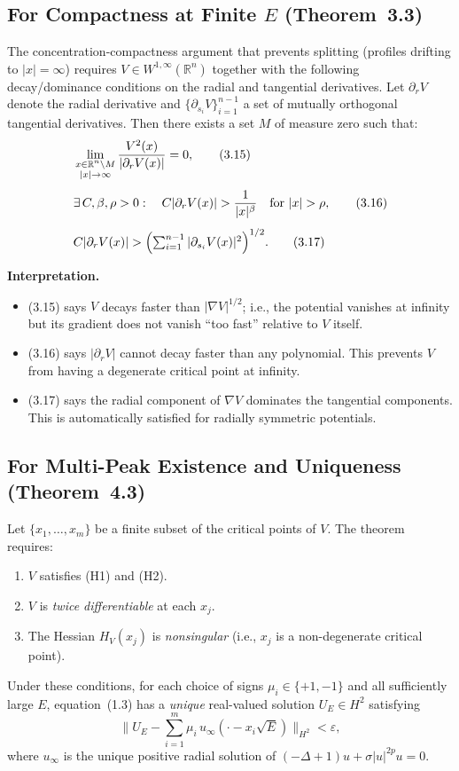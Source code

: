 \documentclass[11pt]{article}
\begin{document}
\subsection{For Compactness at Finite $E$ (Theorem~3.3)}

The concentration-compactness argument that prevents splitting (profiles drifting to $|x|=\infty$) requires $V\in W^{1,\infty}(\mathbb{R}^n)$ together with the following decay/dominance conditions on the radial and tangential derivatives. Let $\partial_r V$ denote the radial derivative and $\{\partial_{s_i}V\}_{i=1}^{n-1}$ a set of mutually orthogonal tangential derivatives. Then there exists a set $M$ of measure zero such that:
\begin{align}
  &\lim_{\substack{x\in\mathbb{R}^n\setminus M \\ |x|\to\infty}} \frac{V^2(x)}{|\partial_r V(x)|} = 0, \tag{3.15}\\[4pt]
  &\exists\, C,\beta,\rho > 0:\quad C|\partial_r V(x)| > \frac{1}{|x|^\beta} \quad\text{for } |x| > \rho, \tag{3.16}\\[4pt]
  &C|\partial_r V(x)| > \Bigl(\textstyle\sum_{i=1}^{n-1}|\partial_{s_i}V(x)|^2\Bigr)^{1/2}. \tag{3.17}
\end{align}

\noindent\textbf{Interpretation.}
\begin{itemize}[nosep]
  \item (3.15) says $V$ decays faster than $|\nabla V|^{1/2}$; i.e., the potential vanishes at infinity but its gradient does not vanish ``too fast'' relative to $V$ itself.
  \item (3.16) says $|\partial_r V|$ cannot decay faster than any polynomial. This prevents $V$ from having a degenerate critical point at infinity.
  \item (3.17) says the radial component of $\nabla V$ dominates the tangential components. This is automatically satisfied for radially symmetric potentials.
\end{itemize}

\subsection{For Multi-Peak Existence and Uniqueness (Theorem~4.3)}

Let $\{x_1,\ldots,x_m\}$ be a finite subset of the critical points of $V$. The theorem requires:
\begin{enumerate}[nosep]
  \item $V$ satisfies (H1) and (H2).
  \item $V$ is \emph{twice differentiable} at each $x_j$.
  \item The Hessian $H_V(x_j)$ is \emph{nonsingular} (i.e., $x_j$ is a non-degenerate critical point).
\end{enumerate}
Under these conditions, for each choice of signs $\mu_i\in\{+1,-1\}$ and all sufficiently large $E$, equation~(1.3) has a \emph{unique} real-valued solution $U_E\in H^2$ satisfying
\[
  \bigl\|U_E - \textstyle\sum_{i=1}^m \mu_i\, u_\infty(\cdot - x_i\sqrt{E})\bigr\|_{H^2} < \varepsilon,
\]
where $u_\infty$ is the unique positive radial solution of $(-\Delta+1)u + \sigma|u|^{2p}u = 0$.
\end{document}
